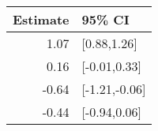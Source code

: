 \begin{tabular}{rl}
  \hline
Estimate & 95\% CI \\ 
  \hline
1.07 & [0.88,1.26] \\ 
  0.16 & [-0.01,0.33] \\ 
  -0.64 & [-1.21,-0.06] \\ 
  -0.44 & [-0.94,0.06] \\ 
   \hline
\end{tabular}

